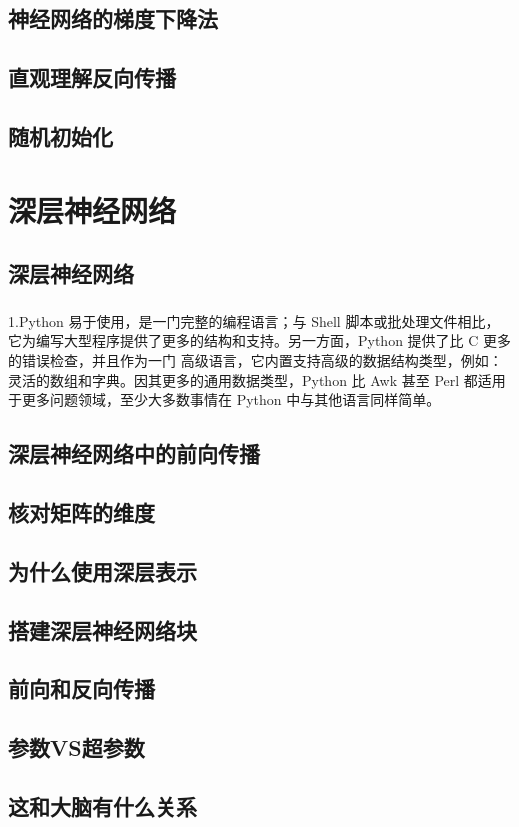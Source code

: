 \documentclass{article}
\begin{document}
\begin{CJK}{UTF8}{gbsn}
\subsection{神经网络的梯度下降法}
\subsection{直观理解反向传播}
\subsection{随机初始化}

\section{深层神经网络}
\subsection{深层神经网络}
\subparagraph{}
1.Python 易于使用，是一门完整的编程语言；与 Shell 脚本或批处理文件相比，它为编写大型程序提供了更多的结构和支持。另一方面，Python 提供了比 C 更多的错误检查，并且作为一门 高级语言，它内置支持高级的数据结构类型，例如：灵活的数组和字典。因其更多的通用数据类型，Python 比 Awk 甚至 Perl 都适用于更多问题领域，至少大多数事情在 Python 中与其他语言同样简单。
\subsection{深层神经网络中的前向传播}
\subsection{核对矩阵的维度}
\subsection{为什么使用深层表示}
\subsection{搭建深层神经网络块}
\subsection{前向和反向传播}
\subsection{参数VS超参数}
\subsection{这和大脑有什么关系}


\end{CJK}
\end{document}
